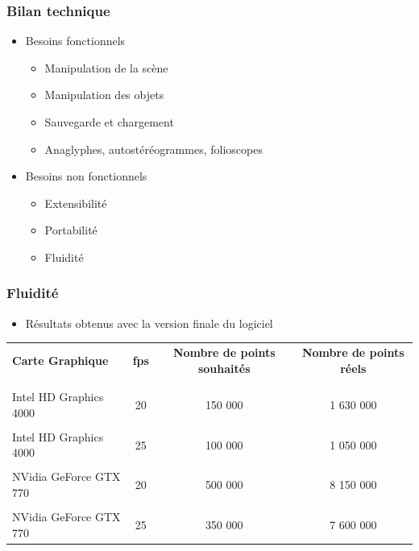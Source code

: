 \documentclass{beamer}
\begin{document}
\begin{frame}
\frametitle{Bilan technique}
\begin{itemize}[label=$\bullet$]
\item Besoins fonctionnels
	\begin{itemize}[label=$\checkmark$]
	\item Manipulation de la scène
	\item Manipulation des objets
	\item Sauvegarde et chargement
	\item Anaglyphes, autostéréogrammes, folioscopes
	\end{itemize}
\item Besoins non fonctionnels
	\begin{itemize}[label=$\checkmark$]
	\item Extensibilité
	\item Portabilité  
	\item Fluidité %
	\end{itemize}
\end{itemize}

\end{frame}


\begin{frame}
\frametitle{Fluidité}
\begin{itemize}[label=$\bullet$]
\item Résultats obtenus avec la version finale du logiciel
\end{itemize}
{\fontsize{7}{8}\selectfont
{}
\begin{tabular}{lccc}

\textbf{Carte Graphique} & \textbf{fps} & \textbf{Nombre de points souhaités}& \textbf{Nombre de points réels}\\
\\
\hline
\\
Intel HD Graphics 4000 &
20 & 150 000 &  1 630 000\\
\hline
\\
Intel HD Graphics 4000 &
25 & 
100 000 & 1 050 000 \\
\hline
\\
NVidia GeForce GTX 770 & 20 & 500 000 & 8 150 000\\
\hline
\\
NVidia GeForce GTX 770 & 25 &
350 000 & 7 600 000\\

\end{tabular}
}

\end{frame}
\end{document}
